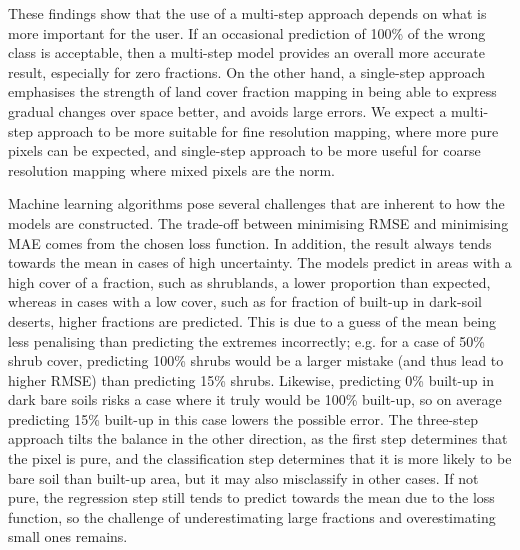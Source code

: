 \documentclass[review,authoryear,3p]{elsarticle}
\begin{document}
These findings show that the use of a multi-step approach depends on what is more important for the user.
If an occasional prediction of 100\% of the wrong class is acceptable, then a multi-step model provides an overall more accurate result, especially for zero fractions.
On the other hand, a single-step approach emphasises the strength of land cover fraction mapping in being able to express gradual changes over space better, and avoids large errors.
We expect a multi-step approach to be more suitable for fine resolution mapping, where more pure pixels can be expected, and single-step approach to be more useful for coarse resolution mapping where mixed pixels are the norm.

Machine learning algorithms pose several challenges that are inherent to how the models are constructed.
The trade-off between minimising \gls{RMSE} and minimising \gls{MAE} comes from the chosen loss function.
In addition, the result always tends towards the mean in cases of high uncertainty.
The models predict in areas with a high cover of a fraction, such as shrublands, a lower proportion than expected, whereas in cases with a low cover, such as for fraction of built-up in dark-soil deserts, higher fractions are predicted.
This is due to a guess of the mean being less penalising than predicting the extremes incorrectly; e.g. for a case of 50\% shrub cover, predicting 100\% shrubs would be a larger mistake (and thus lead to higher \gls{RMSE}) than predicting 15\% shrubs.
Likewise, predicting 0\% built-up in dark bare soils risks a case where it truly would be 100\% built-up, so on average predicting 15\% built-up in this case lowers the possible error.
The three-step approach tilts the balance in the other direction, as the first step determines that the pixel is pure, and the classification step determines that it is more likely to be bare soil than built-up area, but it may also misclassify in other cases.
If not pure, the regression step still tends to predict towards the mean due to the loss function, so the challenge of underestimating large fractions and overestimating small ones remains.
\end{document}
